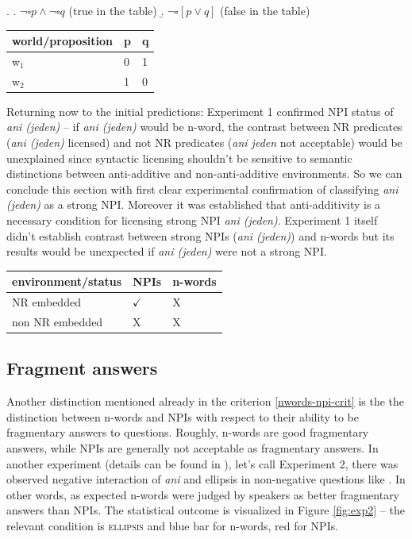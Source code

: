 \documentclass[12pt]{scrartcl}
\begin{document}
\ex. \a. \(\neg \square p \wedge \neg \square q\) (true in the table)
\b. \(\neg \square[p \vee q]\) (false in the table)

\begin{longtable}[]{@{}lll@{}}
\toprule
world/proposition & p & q\tabularnewline
\midrule
\endhead
w\(_1\) & 0 & 1\tabularnewline
w\(_2\) & 1 & 0\tabularnewline
\bottomrule
\end{longtable}

Returning now to the initial predictions: Experiment 1 confirmed NPI status of \textit{ani (jeden)} -- if \textit{ani (jeden)} would be n-word, the contrast between NR predicates (\textit{ani (jeden)} licensed) and not NR predicates (\textit{ani jeden} not acceptable) would be unexplained since syntactic licensing shouldn't be sensitive to semantic distinctions between anti-additive and non-anti-additive environments. So we can conclude this section with first clear  experimental confirmation of classifying \emph{ani (jeden)} as a strong NPI. Moreover it was established that anti-additivity is a necessary condition for licensing strong NPI \textit{ani (jeden)}. Experiment 1 itself didn't establish contrast between strong NPIs (\textit{ani (jeden)}) and n-words but its results would be unexpected if \textit{ani (jeden)} were not a strong NPI.


\begin{longtable}[]{@{}lll@{}}
\toprule
environment/status & NPIs & n-words\tabularnewline
\midrule
\endhead
NR embedded & \(\checkmark\) & X\tabularnewline
non NR embedded & X & X\tabularnewline
\bottomrule
\end{longtable}



\hypertarget{fragment-answers}{%
\subsection{Fragment answers}\label{fragment-answers}}

Another distinction mentioned already in the criterion \ref{nwords-npi-crit} is the the distinction between n-words and NPIs with respect to their ability to be fragmentary answers to questions. Roughly, n-words are good fragmentary answers, while NPIs are generally not acceptable as fragmentary answers. In another experiment (details can be found in \citealt{docekaldotlacilsubber}), let's call Experiment 2, there was observed negative interaction of \emph{ani} and ellipsis in non-negative questions like \Next. In other words, as expected n-words were judged by speakers as better fragmentary answers than NPIs. The statistical outcome is visualized in Figure \ref{fig:exp2} -- the relevant condition is \textsc{ellipsis}  and blue bar for n-words, red for NPIs.
\end{document}
